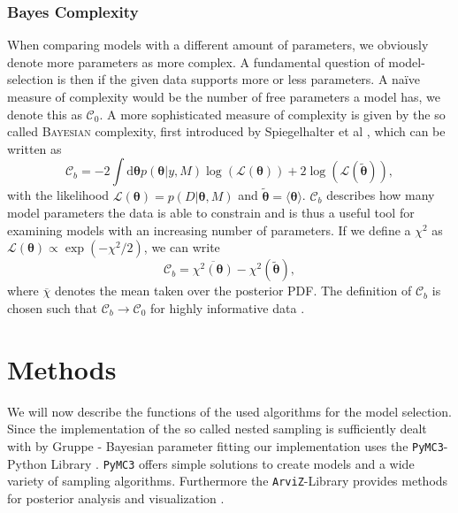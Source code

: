 \documentclass[%
 reprint,
 amsmath,amssymb,
 aps,
]{revtex4-1}
\begin{document}
\subsubsection{\textbf{Bayes Complexity}}
When comparing models with a different amount of parameters, we obviously denote more parameters as more complex. A fundamental question of model-selection is then if the given data supports more or less parameters. A na\"ive measure of complexity would be the number of free parameters a model has, we denote this as $\mathcal{C}_0$. A more sophisticated measure of complexity is given by the so called \textsc{Bayesian} complexity, first introduced by Spiegelhalter et al \cite{Spiegelhalter}, which can be written as \cite{kunz} 
\begin{equation}\label{eq:Bayes_Complexity}
	\mathcal{C}_b=-2\int \text{d}\boldsymbol{\theta} p(\boldsymbol{\theta}|y,M)\log(\mathcal{L}(\boldsymbol{\theta}))+2\log(\mathcal{L}(\boldsymbol{\tilde{\theta}})),
\end{equation}
with  the likelihood $\mathcal{L}(\boldsymbol{\theta})=p(D|\boldsymbol{\theta},M)$ and $\boldsymbol{\tilde{\theta}}=\langle\boldsymbol{\theta}\rangle$. $\mathcal{C}_b$ describes how many model parameters the data is able to constrain \cite{kunz} and is thus a useful tool for examining models with an increasing number of parameters. If we define a $\chi^2$ as $\mathcal{L}(\boldsymbol{\theta})\propto \exp(-\chi^2/2)$, we can write 
\begin{equation}\label{eq:Bayes_Complexity_alt}
	\mathcal{C}_b=\overline{\chi^2(\boldsymbol{\theta})}-\chi^2(\boldsymbol{\tilde{\theta}}),
\end{equation}
where $\overline{\chi}$ denotes the mean taken over the posterior PDF. 
The definition of $\mathcal{C}_b$ is chosen such that $\mathcal{C}_b\to\mathcal{C}_0$ for highly informative data \cite{kunz}.

\section{Methods}\label{sec:meth}
\noindent We will now describe the functions of the used algorithms for the model selection. Since the implementation of the so called nested sampling is sufficiently dealt with by {\color{red} Gruppe - Bayesian parameter fitting} our implementation uses the \texttt{PyMC3}-Python Library \cite{PyMC3}.  \texttt{PyMC3} offers simple solutions to create models and a wide variety of sampling algorithms. Furthermore the \texttt{ArviZ}-Library provides methods for posterior analysis and visualization \cite{ArviZ}.
\end{document}
